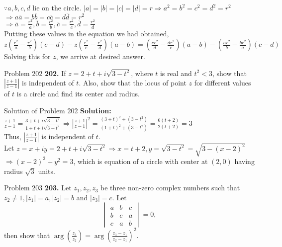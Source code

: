 \documentclass[aspectratio=169,8pt]{beamer}
\begin{document}
\begin{frame}
  $\because a, b, c, d$ lie on the circle. $|a| = |b| = |c| = |d| = r \Rightarrow a^2 = b^2 = c^2 = d^2 = r^2$\\
  \vspace*{0.2cm}
  $\Rightarrow a\overline{a} = b\overline{b} = c\overline{c} = d\overline{d} = r^2$\\
  \vspace*{0.2cm}
  $\Rightarrow \overline{a} = \frac{r^2}{a}, \overline{b} = \frac{r^2}{b}, \overline{c} = \frac{r^2}{c}, \overline{d} =
  \frac{r^2}{d}$\\
  \vspace*{0.2cm}
  Putting these values in the equation we had obtained,
  $z\left(\frac{r^2}{a} - \frac{r^2}{b}\right)(c - d) - z\left(\frac{r^2}{c} - \frac{r^2}{d}\right)(a - b) = \left(\frac{cr^2}{d} -
  \frac{dr^2}{c}\right)(a - b) - \left(\frac{ar^2}{b} - \frac{br^2}{a}\right)(c - d)$\\
  \vspace*{0.2cm}
  Solving this for $z$, we arrive at desired answer.
\end{frame}
\begin{frame}{Problem 202}
  \textbf{202.} If $z = 2 + t + i\sqrt{3 - t^2}$, where $t$ is real and $t^2 < 3$, show that $\left|\frac{z + 1}{z - 1}\right|$ is
  independent of $t$. Also, show that the locus of point $z$ for different values of $t$ is a circle and find its center and
  radius.
\end{frame}
\begin{frame}{Solution of Problem 202}
  \textbf{Solution:} $\frac{z + 1}{z - 1} = \frac{3 + t + i\sqrt{3 - t^2}}{1 + t + i\sqrt{3 - t^2}} \Rightarrow \left|\frac{z +
    1}{z - 1}\right|^2 = \frac{(3 + t)^2 + (3 - t^2)}{(1 + t)^2 + (3 - t^2)} = \frac{6(t + 2)}{2(t + 2)} = 3$\\
  \vspace*{0.2cm}
  Thus, $\left|\frac{z + 1}{z - 1}\right|$ is independent of $t$.\\
  \vspace*{0.2cm}
  Let $z = x + iy = 2 + t + i\sqrt{3 - t^2} \Rightarrow x = t + 2, y = \sqrt{3 - t^2} = \sqrt{3 - (x - 2)^2}$\\
  \vspace*{0.2cm}
  $\Rightarrow (x - 2)^2 + y^2 = 3$, which is equation of a circle with center at $(2,  0)$ having radius $\sqrt{3}$ units.
\end{frame}
\begin{frame}{Problem 203}
  \textbf{203.} Let $z_1, z_2, z_3$ be three non-zero complex numbers such that $z_2 \ne 1, |z_1| = a, |z_2| = b$ and $|z_3| =
  c$. Let $$\begin{vmatrix}a & b & c\\b & c & a\\c & a & b\end{vmatrix} = 0,$$
    then show that $\arg\left(\frac{z_3}{z_2}\right) = \arg\left(\frac{z_3 - z_1}{z_2 - z_1}\right)^2$.
\end{frame}
\end{document}
